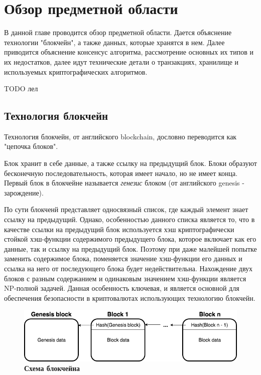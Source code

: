 
\graphicspath{ {images/} }

\startrelatedwork

\chapter{Обзор предметной области}
В данной главе проводится обзор предметной области\cite{example-english}.
Дается объяснение технологии "блокчейн", а также данных, которые хранятся в нем.
Далее приводится объяснение консенсус алгоритма, рассмотрение основных их типов и их недостатков, далее идут технические детали о транзакциях, хранилище и используемых криптографических алгоритмов.

TODO лел

\section{Технология блокчейн}

Технология блокчейн, от английского blockchain, дословно переводится  как "цепочка блоков".

Блок хранит в себе данные, а также ссылку на предыдущий блок. 
Блоки образуют бесконечную последовательность, которая имеет начало, но не имеет конца.
Первый блок в блокчейне называется \textit{генезис} блоком (от английского genesis - зарождение).

По сути блокченй представляет односвязный список, где каждый элемент знает ссылку на предыдущий. 
Однако, особенностью данного списка является то,  что в качестве ссылки на предыдущий блок 
используется хэш криптографически стойкой хэш-функции содержимого предыдущего блока, 
которое включает как его данные, так и ссылку на предыдущий блок. 
Поэтому при даже малейшей попытке заменить содержимое блока, 
поменяется значение хэш-функции его данных и ссылка на него от последующего блока будет недействительна.
Нахождение двух блоков с разным содержанием и одинаковым значением хэш-функции является NP-полной задачей.
Данная особенность ключевая, и  является основной для обеспечения безопасности в криптовалютах использующих технологию блокчейн.

\begin{figure}[h]
\includegraphics[scale=0.6]{Blockchain_Scheme}
\caption{\textbf{Схема блокчейна}}
\label{fig:blockchain}
\end{figure}

